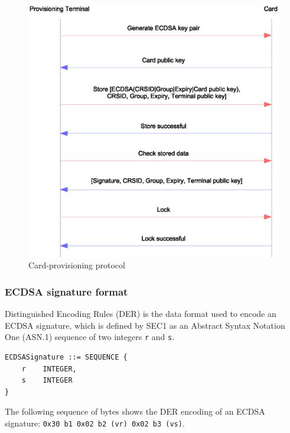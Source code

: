 \documentclass[12pt,a4paper,twoside,openright]{report}
\begin{document}
\begin{figure}[tbh]
\centerline{\includegraphics[scale=0.8]{figures/provisioningprotocol.eps}}
\caption{Card-provisioning protocol}
\label{provisioningprotocol}
\end{figure}

\subsubsection{ECDSA signature format}

Distinguished Encoding Rules (DER) is the data format used to encode an ECDSA signature, which is defined by SEC1 as an Abstract Syntax Notation One (ASN.1) sequence of two integers \texttt{r} and \texttt{s}.

\begin{lstlisting}[caption={ASN.1 structure of an ECDSA signature},captionpos=b]
ECDSASignature ::= SEQUENCE {
    r    INTEGER,
    s    INTEGER
}
\end{lstlisting}

\noindent
The following sequence of bytes shows the DER encoding of an ECDSA signature: \texttt{0x30 b1 0x02 b2 (vr) 0x02 b3 (vs)}.
\end{document}
